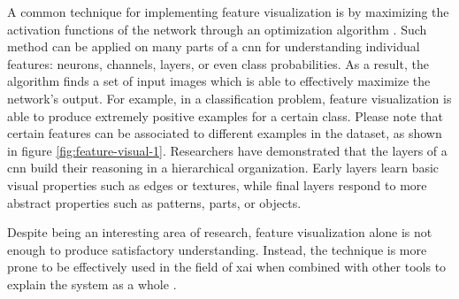 A common technique for implementing feature visualization is by maximizing the activation functions of the network through an optimization algorithm \cite{erhan2009feature, nguyen2016multifaceted}. Such method can be applied on many parts of a \gls{cnn} for understanding individual features: neurons, channels, layers, or even class probabilities. As a result, the algorithm finds a set of input images which is able to effectively maximize the network's output. For example, in a classification problem, feature visualization is able to produce extremely positive examples for a certain class. Please note that certain features can be associated to different examples in the dataset, as shown in figure \ref{fig:feature-visual-1}. Researchers have demonstrated \cite{olah2017feature} that the layers of a \gls{cnn} build their reasoning in a hierarchical organization. Early layers learn basic visual properties such as edges or textures, while final layers respond to more abstract properties such as patterns, parts, or objects.

Despite being an interesting area of research, feature visualization alone is not enough to produce satisfactory understanding. Instead, the technique is more prone to be effectively used in the field of \gls{xai} when combined with other tools to explain the system as a whole \cite{zurowietz2020intvis, olah2018the}.

